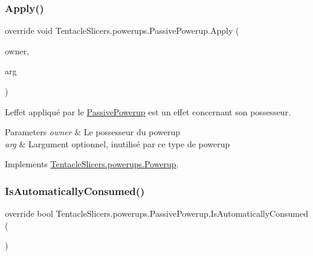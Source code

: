 \subsubsection{\texorpdfstring{Apply()}{Apply()}}
{\footnotesize\ttfamily override void Tentacle\+Slicers.\+powerups.\+Passive\+Powerup.\+Apply (\begin{DoxyParamCaption}\item[{\hyperlink{class_tentacle_slicers_1_1actors_1_1_player_character}{Player\+Character}}]{owner,  }\item[{int}]{arg }\end{DoxyParamCaption})\hspace{0.3cm}{\ttfamily [virtual]}}



L\textquotesingle{}effet appliqué par le \hyperlink{class_tentacle_slicers_1_1powerups_1_1_passive_powerup}{Passive\+Powerup} est un effet concernant son possesseur. 


\begin{DoxyParams}{Parameters}
{\em owner} & Le possesseur du powerup \\
\hline
{\em arg} & L\textquotesingle{}argument optionnel, inutilisé par ce type de powerup \\
\hline
\end{DoxyParams}


Implements \hyperlink{class_tentacle_slicers_1_1powerups_1_1_powerup_a64288aa9b1e9f242082be54f1d73f8ba}{Tentacle\+Slicers.\+powerups.\+Powerup}.

\mbox{\label{class_tentacle_slicers_1_1powerups_1_1_passive_powerup_ae6f8556eac0226913c40d83358b385d0}} 
\subsubsection{\texorpdfstring{Is\+Automatically\+Consumed()}{IsAutomaticallyConsumed()}}
{\footnotesize\ttfamily override bool Tentacle\+Slicers.\+powerups.\+Passive\+Powerup.\+Is\+Automatically\+Consumed (\begin{DoxyParamCaption}{ }\end{DoxyParamCaption})\hspace{0.3cm}{\ttfamily [virtual]}}



